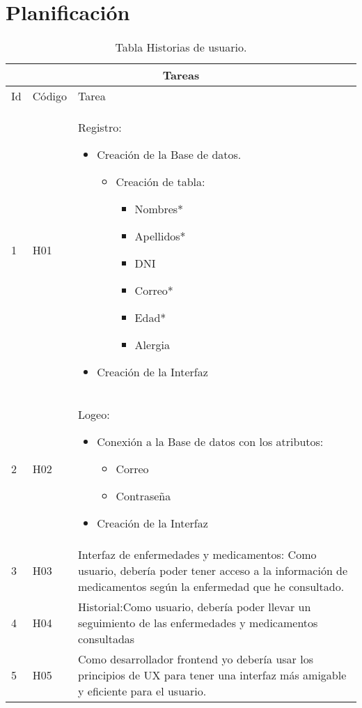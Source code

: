 \chapter{Planificación}

\begin{table}[htb]
\centering
\begin{tabular}{|l|p{1.5cm}|p{10cm}|}
	\hline
	\multicolumn{3}{|c|}{Tareas} \\ \hline
	Id & Código & Tarea \\
	\hline \hline
	1 & H01  & Registro:\begin{itemize}
		\item Creación de la Base de datos.
			\begin{itemize}
			\item Creación de tabla:
			 		\begin{itemize}
			 		\item Nombres*
			 		\item Apellidos*
			 		\item DNI
			 		\item Correo*
			 		\item Edad*
			 		\item Alergia		 	 
			 	\end{itemize}
			\end{itemize}
		\item Creación de la Interfaz
		
		
	\end{itemize}\\ \hline
	
	2 & H02  & Logeo: \begin{itemize}
		\item Conexión a la Base de datos con los atributos:							
			\begin{itemize}						
				\item Correo
				\item Contraseña	 	 				
			\end{itemize}
		
		\item Creación de la Interfaz
		\end{itemize}\\ \hline
	
	3 & H03 & Interfaz de enfermedades y medicamentos: 
	Como usuario, debería poder tener acceso a la información de medicamentos según la enfermedad que he consultado.   \\ \hline
	
	4 & H04  & Historial:Como usuario, debería poder llevar un seguimiento de las enfermedades y medicamentos consultadas \\ \hline
	
	5 & H05  & Como desarrollador frontend yo debería usar los 
	principios de UX para tener una interfaz más amigable 
	y eficiente para el usuario. 
	\\ \hline
	
	
\end{tabular}
\caption{Tabla Historias de usuario.}
\label{tabla:Historial}
\end{table}